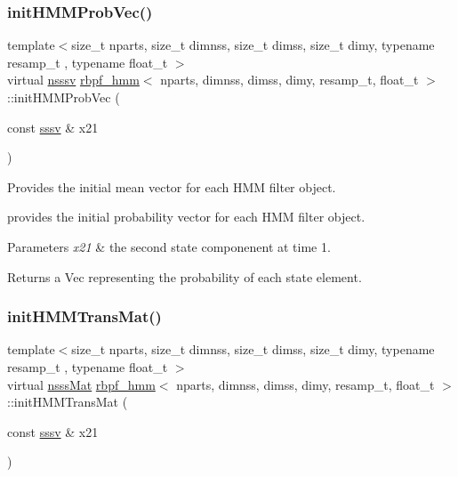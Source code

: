 \subsubsection{\texorpdfstring{init\+H\+M\+M\+Prob\+Vec()}{initHMMProbVec()}}
{\footnotesize\ttfamily template$<$size\+\_\+t nparts, size\+\_\+t dimnss, size\+\_\+t dimss, size\+\_\+t dimy, typename resamp\+\_\+t , typename float\+\_\+t $>$ \\
virtual \hyperlink{classrbpf__hmm_a7988465662f94f2ba45fd22566828d0f}{nsssv} \hyperlink{classrbpf__hmm}{rbpf\+\_\+hmm}$<$ nparts, dimnss, dimss, dimy, resamp\+\_\+t, float\+\_\+t $>$\+::init\+H\+M\+M\+Prob\+Vec (\begin{DoxyParamCaption}\item[{const \hyperlink{classrbpf__hmm_a28e8ad1d93bcf53cb74603f74826a81c}{sssv} \&}]{x21 }\end{DoxyParamCaption})\hspace{0.3cm}{\ttfamily [pure virtual]}}



Provides the initial mean vector for each H\+MM filter object. 

provides the initial probability vector for each H\+MM filter object. 
\begin{DoxyParams}{Parameters}
{\em x21} & the second state componenent at time 1. \\
\hline
\end{DoxyParams}
\begin{DoxyReturn}{Returns}
a Vec representing the probability of each state element. 
\end{DoxyReturn}
\mbox{\label{classrbpf__hmm_a997a21d39e1f692c28968000e809309a}} 
\subsubsection{\texorpdfstring{init\+H\+M\+M\+Trans\+Mat()}{initHMMTransMat()}}
{\footnotesize\ttfamily template$<$size\+\_\+t nparts, size\+\_\+t dimnss, size\+\_\+t dimss, size\+\_\+t dimy, typename resamp\+\_\+t , typename float\+\_\+t $>$ \\
virtual \hyperlink{classrbpf__hmm_a7ae942768da71581665168d3c3063c3f}{nsss\+Mat} \hyperlink{classrbpf__hmm}{rbpf\+\_\+hmm}$<$ nparts, dimnss, dimss, dimy, resamp\+\_\+t, float\+\_\+t $>$\+::init\+H\+M\+M\+Trans\+Mat (\begin{DoxyParamCaption}\item[{const \hyperlink{classrbpf__hmm_a28e8ad1d93bcf53cb74603f74826a81c}{sssv} \&}]{x21 }\end{DoxyParamCaption})\hspace{0.3cm}{\ttfamily [pure virtual]}}



